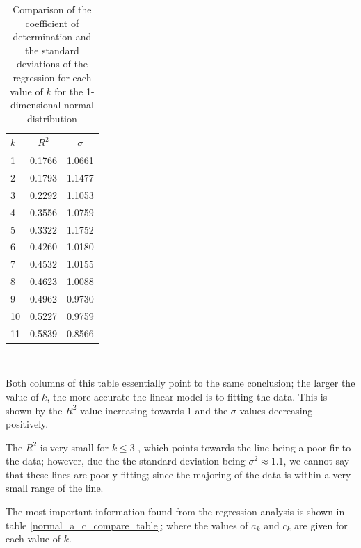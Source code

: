 \documentclass[12pt]{report}
\begin{document}
\begin{table}
\caption{Comparison of the coefficient of determination and the standard deviations of the regression for each value of $k$ for the 1-dimensional normal distribution} \label{normal_rsq}
\begin{center}
\begin{tabular}{| l | c c |} 
\toprule
$k$ & $R^2$ & $\sigma$ \\
\midrule[1pt]
1     & 0.1766    & 1.0661    \\
2     & 0.1793    & 1.1477    \\
3     & 0.2292    & 1.1053    \\
4     & 0.3556    & 1.0759    \\
5     & 0.3322    & 1.1752   \\
6     & 0.4260    & 1.0180   \\
7     & 0.4532    & 1.0155   \\
8     & 0.4623    & 1.0088   \\
9     & 0.4962    & 0.9730   \\
10    & 0.5227    & 0.9759   \\
11    & 0.5839    & 0.8566  \\
\hline
\end{tabular}
\\[10pt]
\end{center}
\end{table}

Both columns of this table essentially point to the same conclusion; the larger the value of $k$, the more accurate the linear model is to fitting the data. This is shown by the $R^2$ value increasing towards $1$ and the $\sigma$ values decreasing positively. 

The $R^2$ is very small for $k \leq 3$ , which points towards the line being a poor fir to the data; however, due the the standard deviation being $\sigma^2 \approx 1.1$, we cannot say that these lines are poorly fitting; since the majoring of the data is within a very small range of the line.

The most important information found from the regression analysis is shown in table \ref{normal_a_c_compare_table}; where the values of $a_{k}$ and $c_{k}$ are given for each value of $k$.
\end{document}
